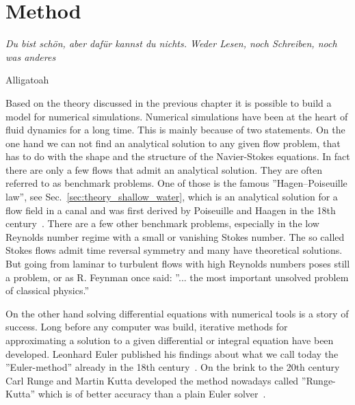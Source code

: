 \chapter{Method}
\label{chapter:method}
\epigraph{\textit{Du bist schön, aber dafür kannst du nichts.
Weder Lesen, noch Schreiben, noch was anderes}}{Alligatoah}
Based on the theory discussed in the previous chapter it is possible to build a model for numerical simulations.
Numerical simulations have been at the heart of fluid dynamics for a long time.
This is mainly because of two statements.
On the one hand we can not find an analytical solution to any given flow problem, that has to do with the shape and the structure of the Navier-Stokes equations.
In fact there are only a few flows that admit an analytical solution. 
They are often referred to as benchmark problems.
One of those is the famous ''Hagen–Poiseuille law'', see  Sec.~\ref{sec:theory_shallow_water}, which is an analytical solution for a flow field in a canal and was first derived by Poiseuille and Haagen in the 18th century~\cite{suteraHistoryPoiseuilleLaw}.
There are a few other benchmark problems, especially in the low Reynolds number regime with a small or vanishing Stokes number.
The so called Stokes flows admit time reversal symmetry and many have theoretical solutions.
But going from laminar to turbulent flows with high Reynolds numbers poses still a problem, or as R. Feynman once said: ''... the most important unsolved problem of classical physics.''

On the other hand solving differential equations with numerical tools is a story of success.
Long before any computer was build, iterative methods for approximating a solution to a given differential or integral equation have been developed.
Leonhard Euler published his findings about what we call today the ''Euler-method'' already in the 18th century~\cite{brezinski2012numerical}.
On the brink to the 20th century Carl Runge and Martin Kutta developed the method nowadays called ''Runge-Kutta'' which is of better accuracy than a plain Euler solver~\cite{kutta1901beitrag, runge1895numerische}.

